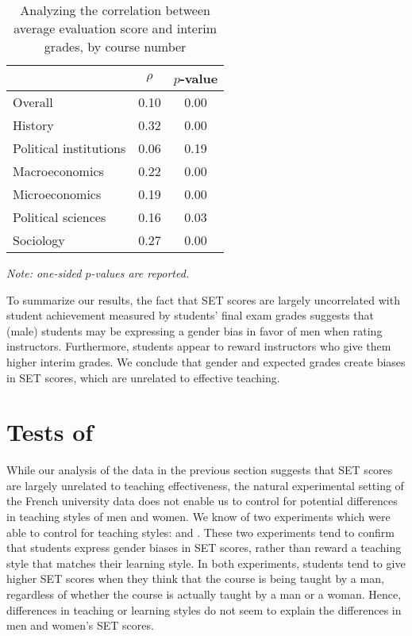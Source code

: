 \documentclass[12pt]{article}
\begin{document}
\begin{table}[htbp]
  \centering
  \footnotesize 
  \caption{Analyzing the correlation between average evaluation score and interim grades, by course number}
    \begin{tabular}{lcc}
    \toprule 
                          & $\rho$  & $p$-value  \\
   \midrule
    Overall &                 0.10       & 0.00   \\
    History &                 0.32       & 0.00   \\
    Political institutions &  0.06       & 0.19     \\
    Macroeconomics &          0.22       & 0.00    \\
    Microeconomics &          0.19       & 0.00     \\
    Political sciences &      0.16       & 0.03     \\
    Sociology &               0.27       & 0.00     \\
    \bottomrule
    \end{tabular}%
 \label{tab:instructor gender}%
  
  \textit{Note: one-sided $p$-values are reported.}
\end{table}%
\normalsize





To summarize our results, the fact that SET scores are largely uncorrelated with student achievement measured by students' final exam grades suggests that (male) students may be expressing a gender bias in favor of men when rating instructors. Furthermore, students appear to reward instructors who give them higher interim grades. We conclude that gender and expected grades create biases in SET scores, which are unrelated to effective teaching. 

\section{Tests of \citet{MacNell2014}}

While our analysis of the data in the previous section suggests that SET scores are largely unrelated to teaching effectiveness, the natural experimental setting of the French university data does not enable us to control for potential differences in teaching styles of men and women. We know of two experiments which were able to control for teaching styles: \citet{Arbuckle2003} and \citet{MacNell2014}. These two experiments tend to confirm that students express gender biases in SET scores, rather than reward a teaching style that matches their learning style. In both experiments, students tend to give higher SET scores when they think that the course is being taught by a man, regardless of whether the course is actually taught by a man or a woman. Hence, differences in teaching or learning styles do not seem to explain the differences in men and women's SET scores.
\end{document}
